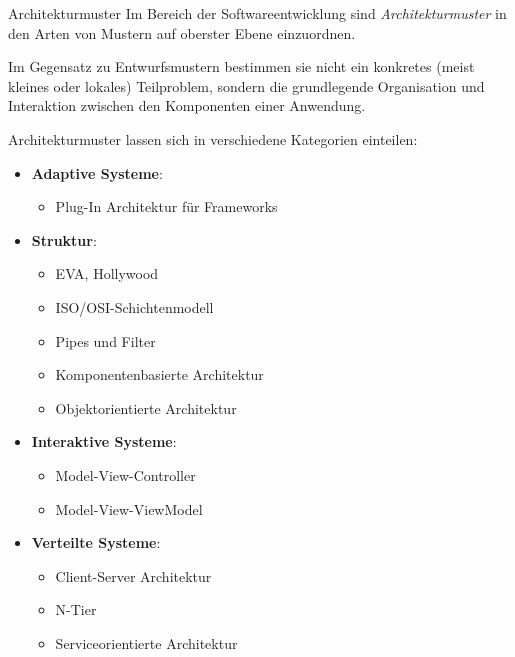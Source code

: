 \begin{defi}{Architekturmuster}
    Im Bereich der Softwareentwicklung sind \emph{Architekturmuster} in den Arten von Mustern auf oberster Ebene einzuordnen.

    Im Gegensatz zu Entwurfsmustern bestimmen sie nicht ein konkretes (meist kleines oder lokales) Teilproblem, sondern die grundlegende Organisation und Interaktion zwischen den Komponenten einer Anwendung.

    Architekturmuster lassen sich in verschiedene Kategorien einteilen:
    \begin{itemize}
        \item \textbf{Adaptive Systeme}:
              \begin{itemize}
                  \item Plug-In Architektur für Frameworks
              \end{itemize}
        \item \textbf{Struktur}:
              \begin{itemize}
                  \item EVA, Hollywood
                  \item ISO/OSI-Schichtenmodell
                  \item Pipes und Filter
                  \item Komponentenbasierte Architektur
                  \item Objektorientierte Architektur
              \end{itemize}
        \item \textbf{Interaktive Systeme}:
              \begin{itemize}
                  \item Model-View-Controller
                  \item Model-View-ViewModel
              \end{itemize}
        \item \textbf{Verteilte Systeme}:
              \begin{itemize}
                  \item Client-Server Architektur
                  \item N-Tier
                  \item Serviceorientierte Architektur
              \end{itemize}
    \end{itemize}
\end{defi}

